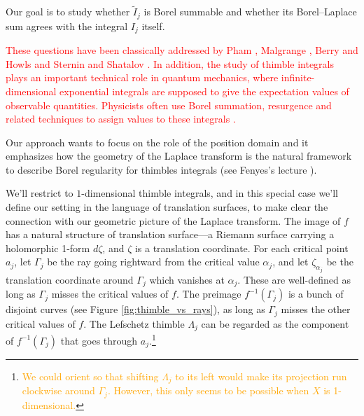 \documentclass{article}
\theoremstyle{definition}
\theoremstyle{plain}
\begin{document}
Our goal is to study whether $\tilde{I}_j$ is Borel summable and whether its Borel--Laplace sum agrees with the integral $I_j$ itself. 

\textcolor{red}{These questions have been classically addressed by Pham \cite[Section 3.3]{pham}, Malgrange \cite[Theorem 6]{Malgrange22}, Berry and Howls \cite{berry1991hyperasymptotics} and Sternin and Shatalov \cite[Theorem 3.9 and 3.10]{sternin1995borel}. In addition, the study of thimble integrals plays an important technical role in quantum mechanics, where infinite-dimensional exponential integrals are supposed to give the expectation values of observable quantities. Physicists often use Borel summation, resurgence and related techniques to assign values to these integrals \cite{costin_kruskal,delabaere_dillinger_pham,delabaere-howls,Delabaere-Pham99,dingle1973asymptotic,dunne-unsal,gukov-marino-purtrov-resurgence,pham1988resurgence,Howls}.}

Our approach wants to focus on the role of the position domain and it emphasizes how the geometry of the Laplace transform is the natural framework to describe Borel regularity for thimbles integrals (see Fenyes's lecture \cite{Fenyes-ihes-lecture}).  

We’ll restrict to $1$-dimensional thimble integrals, and in this special case we’ll define our setting in the language of translation surfaces, to make clear the connection with our geometric picture of the Laplace transform. The image of $f$ has a natural structure of translation surface---a Riemann surface carrying a holomorphic 1-form $d\zeta$, and $\zeta$ is a translation coordinate. 
For each critical point $a_j$, let $\Gamma_j$ be the ray going rightward from the critical value $\alpha_j$, and let $\zeta_{\alpha_j}$ be the translation coordinate around $\Gamma_j$ which vanishes at $\alpha_j$. These are well-defined as long as $\Gamma_j$ misses the critical values of $f$. The preimage $f^{-1}(\Gamma_j)$ is a bunch of disjoint curves (see Figure \ref{fig:thimble_vs_rays}), as long as $\Gamma_j$ misses the other critical values of $f$. The Lefschetz thimble $\Lambda_j$ can be regarded as the component of $f^{-1}(\Gamma_j)$ that goes through $a_j$.\footnote{\textcolor{orange}{We could orient so that shifting $\Lambda_j$ to its left would make its projection run clockwise around $\Gamma_j$. However, this only seems to be possible when $X$ is 1-dimensional.}}
\end{document}
